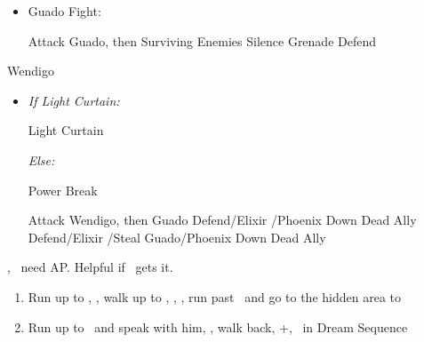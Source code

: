 \begin{encounters}
  \begin{itemize}
    \item Guado Fight:
          \begin{itemize}
            \tidusf Attack Guado, then Surviving Enemies
            \rikkuf Silence Grenade
            \yunaf Defend
          \end{itemize}
  \end{itemize}
\end{encounters}
\begin{battle}[18000]{Wendigo}
  \begin{itemize}
    \tidusf Haste \tidus
    \tidusf Switch Weapon to Brotherhood
    \tidusf Attack Guado B (Top One)
    \item \textit{If Light Curtain:}
    \begin{itemize}
	    \rikkuf Light Curtain \tidus
    \end{itemize}
    \textit{Else:}
    \begin{itemize}
    		\switch{\rikku}{\auron}
    		\auronf Power Break
	\end{itemize}
    \tidusf Attack Wendigo, then Guado
    \yunaf Defend/Elixir \tidus/Phoenix Down Dead Ally
    \rikkuf Defend/Elixir \tidus/Steal Guado/Phoenix Down Dead Ally
    \switch{\yuna}{\lulu}
  \end{itemize}
\yuna, \tidus\ need AP. Helpful if \lulu\ gets it.
\end{battle}
\begin{enumerate}[resume]
  \item Run up to \rikku, \sd, walk up to \yuna, \sd, \save, run past \kimahri\ and go to the hidden area to 
  \item Run up to \auron\ and speak with him, \sd, walk back, \cs+\skippablefmv[1:00], \sd\ in Dream Sequence
\end{enumerate}